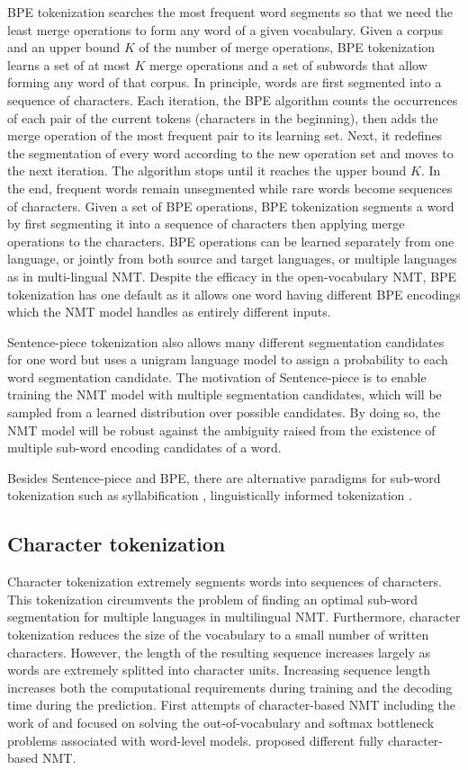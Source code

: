 BPE tokenization searches the most frequent word segments so that we need the least merge operations to form any word of a given vocabulary. Given a corpus and an upper bound $K$ of the number of merge operations, BPE tokenization learns a set of at most $K$ merge operations and a set of subwords that allow forming any word of that corpus. In principle, words are first segmented into a sequence of characters. Each iteration, the BPE algorithm counts the occurrences of each pair of the current tokens (characters in the beginning), then adds the merge operation of the most frequent pair to its learning set. Next, it redefines the segmentation of every word according to the new operation set and moves to the next iteration. The algorithm stops until it reaches the upper bound $K$. In the end, frequent words remain unsegmented while rare words become sequences of characters. Given a set of BPE operations, BPE tokenization segments a word by first segmenting it into a sequence of characters then applying merge operations to the characters. BPE operations can be learned separately from one language, or jointly from both source and target languages, or multiple languages as in multi-lingual NMT. Despite the efficacy in the open-vocabulary NMT, BPE tokenization has one default as it allows one word having different BPE encodings \citep{Taku18subword} which the NMT model handles as entirely different inputs.

Sentence-piece tokenization also allows many different segmentation candidates for one word but uses a unigram language model to assign a probability to each word segmentation candidate. The motivation of Sentence-piece is to enable training the NMT model with multiple segmentation candidates, which will be sampled from a learned distribution over possible candidates. By doing so, the NMT model will be robust against the ambiguity raised from the existence of multiple sub-word encoding candidates of a word. 

Besides Sentence-piece and BPE, there are alternative paradigms for sub-word tokenization such as syllabification \citep{Assylbekov17syllable}, linguistically informed tokenization \citep{Ataman17linguistically, Huck17target, Machcek18morphological}.
\subsection{Character tokenization}
Character tokenization extremely segments words into sequences of characters. This tokenization circumvents the problem of finding an optimal sub-word segmentation for multiple languages in multilingual NMT. Furthermore, character tokenization reduces the size of the vocabulary to a small number of written characters. However, the length of the resulting sequence increases largely as words are extremely splitted into character units. Increasing sequence length increases both the computational requirements during training and the decoding time during the prediction. First attempts of character-based NMT including the work of \cite{Wang15character} and \cite{Luong16achieving} focused on solving the out-of-vocabulary and softmax bottleneck problems associated with word-level models. \cite{Costa16character, Lee17fully, Chung16character, costa17byte} proposed different fully character-based NMT.
